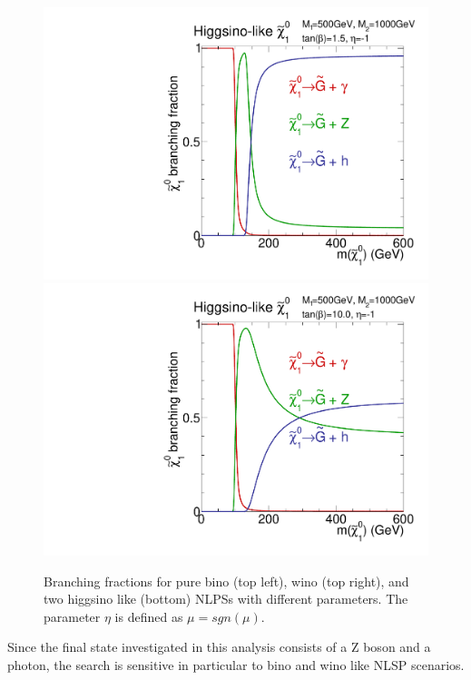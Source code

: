 \begin{figure}[htb]
 \includegraphics[width=\pairwidth]{figures/signal/higgsinoBranching1}
 \includegraphics[width=\pairwidth]{figures/signal/higgsinoBranching2}
 \caption{Branching fractions for pure bino (top left), wino (top right), and two higgsino like (bottom) NLPSs with different parameters. The parameter $\eta$ is defined as $\mu=sgn(\mu)$.}
 \label{fig:BRNLSP}
\end{figure}
Since the final state investigated in this analysis consists of a Z boson and a photon, the search is sensitive in particular to bino and wino like NLSP scenarios.\\
